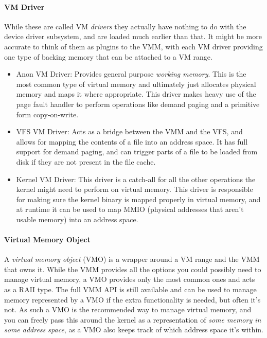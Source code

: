 \paragraph{VM Driver} 
\label{vmdrivers}
While these are called VM \textit{drivers} they actually have nothing to do with the device driver subsystem, and are loaded much earlier than that. It might be more accurate to think of them as plugins to the VMM, with each VM driver providing one type of backing memory that can be attached to a VM range.

\begin{itemize}
    \item Anon VM Driver: Provides general purpose \textit{working memory}. This is the most common type of virtual memory and ultimately just allocates physical memory and maps it where appropriate. This driver makes heavy use of the page fault handler to perform operations like demand paging and a primitive form copy-on-write.
    \item VFS VM Driver: Acts as a bridge between the VMM and the VFS, and allows for mapping the contents of a file into an address space. It has full support for demand paging, and can trigger parts of a file to be loaded from disk if they are not present in the file cache.
    \item Kernel VM Driver: This driver is a catch-all for all the other operations the kernel might need to perform on virtual memory. This driver is responsible for making sure the kernel binary is mapped properly in virtual memory, and at runtime it can be used to map MMIO (physical addresses that aren't usable memory) into an address space.
\end{itemize}

\paragraph{Virtual Memory Object}
A \textit{virtual memory object} (VMO) is a wrapper around a VM range and the VMM that owns it. While the VMM provides all the options you could possibly need to manage virtual memory, a VMO provides only the most common ones and acts as a RAII type. The full VMM API is still available and can be used to manage memory represented by a VMO if the extra functionality is needed, but often it's not. As such a VMO is the recommended way to manage virtual memory, and you can freely pass this around the kernel as a representation of \textit{some memory in some address space}, as a VMO also keeps track of which address space it's within.

